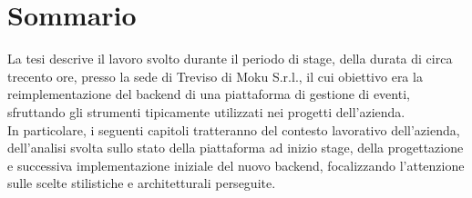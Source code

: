 \cleardoublepage
{}
{}
\begingroup
\let\clearpage\relax
\let\cleardoublepage\relax
\let\cleardoublepage\relax

\chapter*{Sommario}
La tesi descrive il lavoro svolto durante il periodo di stage, della durata di circa trecento ore, presso la sede di Treviso di Moku S.r.l., il cui obiettivo era la reimplementazione del backend di una piattaforma di gestione di eventi, sfruttando gli strumenti tipicamente utilizzati nei progetti dell'azienda. \\
In particolare, i seguenti capitoli tratteranno del contesto lavorativo dell'azienda, dell'analisi svolta sullo stato della piattaforma ad inizio stage, della progettazione e successiva implementazione iniziale del nuovo backend, focalizzando l'attenzione sulle scelte stilistiche e architetturali perseguite.

%
%

\endgroup			

\vfill
